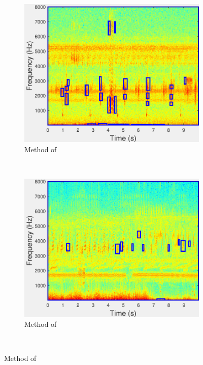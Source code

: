 \begin{figure}
        \begin{subfigure}[b]{0.35\textwidth}
                \includegraphics[width=\textwidth]{image/Ch7/AEDFodor.pdf}
                \caption{Method of \cite{fodor2013ninth}}
        \end{subfigure}%
                ~        
        \begin{subfigure}[b]{0.35\textwidth}
                \includegraphics[width=\textwidth]{image/Ch7/AEDFodor_2.pdf}
                \caption{Method of \cite{fodor2013ninth}}
        \end{subfigure}
\\


\end{figure}
